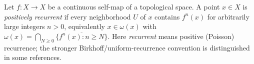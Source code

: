 
Let $f:X\to X$ be a continuous self-map of a topological space. A point $x\in X$ is \emph{positively recurrent} if every neighborhood $U$ of $x$ contains $f^n(x)$ for arbitrarily large integers $n>0$, equivalently $x\in\omega(x)$ with $\omega(x)=\bigcap_{N\ge0}\overline{\{f^n(x):n\ge N\}}$. Here \emph{recurrent} means positive (Poisson) recurrence; the stronger Birkhoff/uniform-recurrence convention is distinguished in some references.
